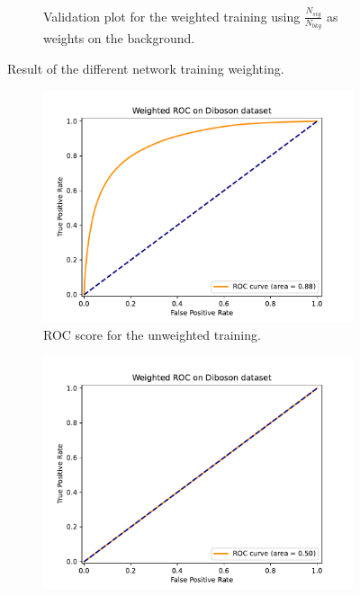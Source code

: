 \documentclass[14pt, a4paper]{book}
\begin{document}
\begin{figure}[!ht]
\begin{subfigure}[b]{0.8\textwidth}
        \caption{Validation plot for the weighted training using $\frac{N_{sig}}{N_{bkg}}$ as weights on the background.}\label{fig:DibosonVALW}
     \end{subfigure}
	\caption{Result of the different network training weighting.}\label{fig:DibosonVAL}
\end{figure}
\begin{figure}[!ht]
	\centering
	\begin{subfigure}[b]{0.49\textwidth}
        \centering
        \includegraphics[width=1\textwidth]{ROC_uw.pdf}
        \caption{ROC score for the unweighted training.}\label{fig:DibosonROCUW}
     \end{subfigure}
     \hfill
     \begin{subfigure}[b]{0.49\textwidth}
        \centering
        \includegraphics[width=1\textwidth]{ROC_mc.pdf}

\end{subfigure}
\end{figure}
\end{document}
